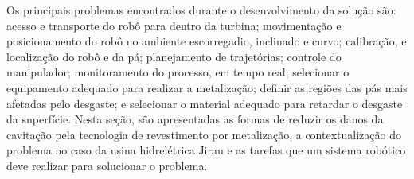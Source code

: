 Os principais problemas encontrados durante o desenvolvimento da solução
são: acesso e transporte do robô para dentro da turbina; movimentação e
posicionamento do robô no ambiente escorregadio, inclinado e curvo; calibração,
e localização do robô e da pá; planejamento de trajetórias; controle do
manipulador; monitoramento do processo, em tempo real; selecionar o equipamento
adequado para realizar a metalização; definir as regiões das pás mais afetadas
pelo desgaste; e selecionar o material adequado para retardar o desgaste da
superfície. Nesta seção, são apresentadas as formas de reduzir os danos da
cavitação pela tecnologia de revestimento por metalização, a contextualização
do problema no caso da usina hidrelétrica Jirau e as tarefas que um sistema
robótico deve realizar para solucionar o problema.

